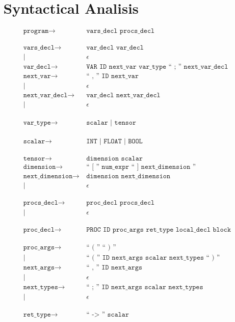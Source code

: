 \section{Syntactical Analisis}
\begin{align*}
	\texttt{program}
	\rightarrow&\ \texttt{vars\_decl procs\_decl}\\
	\phantom{0}\\
	\texttt{vars\_decl}
	\rightarrow&\ \texttt{var\_decl var\_decl}\\
            |&\ \epsilon\\
	\texttt{var\_decl}
	\rightarrow&\ \texttt{VAR ID next\_var var\_type `` ; '' next\_var\_decl}\\
	\texttt{next\_var}
	\rightarrow&\ \texttt{`` , '' ID next\_var}\\
            |&\ \epsilon\\
	\texttt{next\_var\_decl}
	\rightarrow&\ \texttt{var\_decl next\_var\_decl}\\
            |&\ \epsilon\\
	\phantom{0}\\
	\texttt{var\_type}
	\rightarrow&\ \texttt{scalar | tensor}\\
	\phantom{0}\\
	\texttt{scalar}
	\rightarrow&\ \texttt{INT | FLOAT | BOOL}\\
	\phantom{0}\\
	\texttt{tensor}
	\rightarrow&\ \texttt{dimension scalar}\\
	\texttt{dimension}
	\rightarrow&\ \texttt{`` [ '' num\_expr `` ] next\_dimension ''}\\
	\texttt{next\_dimension}
	\rightarrow&\ \texttt{dimension next\_dimension}\\
            |&\ \epsilon\\
	\phantom{0}\\
	\texttt{procs\_decl}
	\rightarrow&\ \texttt{proc\_decl procs\_decl}\\
            |&\ \epsilon\\
	\phantom{0}\\
	\texttt{proc\_decl}
	\rightarrow&\ \texttt{PROC ID proc\_args ret\_type local\_decl block}\\
	\phantom{0}\\
	\texttt{proc\_args}
	\rightarrow&\ \texttt{`` ( '' `` ) ''}\\
            |&\ \texttt{`` ( '' ID next\_args scalar next\_types `` ) ''}\\
	\texttt{next\_args}
	\rightarrow&\ \texttt{`` , '' ID next\_args}\\
            |&\ \epsilon\\
	\texttt{next\_types}
	\rightarrow&\ \texttt{`` ; '' ID next\_args scalar next\_types}\\
            |&\ \epsilon\\
	\phantom{0}\\
	\texttt{ret\_type}
	\rightarrow&\ \texttt{`` -> '' scalar}\\
\end{align*}

